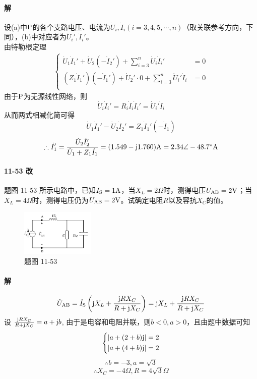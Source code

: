 \documentclass[hyperref, UTF8]{ctexart}
\newcommand{\volt}{{\rm V}}
\newcommand{\source}{{\rm S}}
\newcommand{\ampere}{{\rm A}}
\newcommand{\ohm}{\Omega}
\newcommand{\degree}{^{\circ}}
\newcommand{\J}{{\rm j}}
\begin{document}
\paragraph{解}设(a)中$\rm P$的各个支路电压、电流为$\dot U_i, \dot I_i (i=3,4,5,\cdots,n)$（取关联参考方向，下同），(b)中对应者为$\dot U_i', \dot I_i' $。\\
由特勒根定理
\begin{align*}
\left\{ \begin{aligned}
 \dot U _1 \dot I _1'+ \dot U _2(- \dot I _2') + \sum_{i=3}^{n} \dot U _i \dot I _i' &= 0 \\
 (Z_1 \dot I _1')(- \dot I _1') + \dot U _2' \cdot 0 + \sum_{i=3}^{n} \dot U _i' \dot I _i &= 0 \\
\end{aligned} \right.
\end{align*}
由于$\rm P$为无源线性网络，则
 $$ \dot U _i \dot I _i' = R_i \dot I _i \dot I _i' = \dot U _i' \dot I _i$$
从而两式相减化简可得
 $$ \dot U _1 \dot I _1' - \dot U _2 \dot I _2' = Z_1 \dot I _1'(- \dot I _1) $$
 $$ \therefore \dot I _1' = \frac{ \dot U _2 \dot I _2'}{ \dot U _1+Z_1 \dot I _1} = (1.549 - \J 1.760) \ampere = 2.34 \angle -48.7 \degree \ampere $$

\paragraph{11-53 改}\label{11-53}
题图 11-53 所示电路中，已知$I_\source = 1\ampere$，当$X_L=2\ohm$时，测得电压$U_{\rm AB}=2\volt$；当$X_L=4\ohm$时，测得电压仍为$U_{\rm AB}=2\volt$。试确定电阻$R$以及容抗$X_C$的值。

\begin{figure}[!htb]
\centering
\includegraphics[width=0.311\textwidth]{p11-53.png}
\caption*{题图 11-53}
\end{figure}

\paragraph{解}
$$ \dot U _{\rm AB} = \dot I _\source \left( \J X_L + \frac{ \J RX_C}{R+ \J X_C} \right) = \J X_L + \frac{ \J RX_C}{R+ \J X_C} $$
设 $\frac{ \J RX_C}{R+ \J X_C} = a + \J b$, 由于是电容和电阻并联，则$b<0, a>0$，且由题中数据可知
\begin{align*}
\left\{ \begin{aligned}
\left| a+(2+b) \J \right| & = 2 \\
\left| a+(4+b) \J \right| & = 2
\end{aligned} \right. 
\end{align*}
$$ \therefore b = -3, a = \sqrt{3} $$
$$ \therefore X_C = -4 \ohm, R = 4\sqrt{3} \ohm $$
\end{document}
